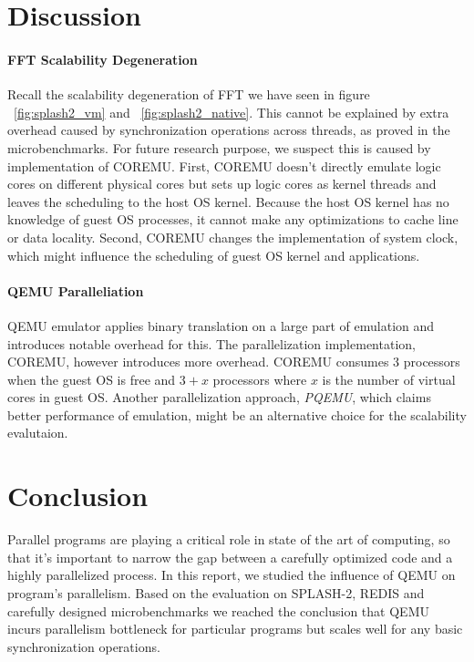 \section{Discussion}

\paragraph{FFT Scalability Degeneration} Recall the scalability degeneration of FFT
we have seen in figure ~\ref{fig:splash2_vm} and ~\ref{fig:splash2_native}. This 
cannot be explained by extra overhead caused by synchronization operations across
threads, as proved in the microbenchmarks. For future research purpose, we suspect
this is caused by implementation of COREMU. First, COREMU doesn't directly emulate
logic cores on different physical cores but sets up logic cores as kernel threads 
and leaves the scheduling to the host OS kernel. Because the host OS kernel has 
no knowledge of guest OS processes, it cannot make any optimizations to cache line
or data locality. Second, COREMU changes the implementation of system clock, which
might influence the scheduling of guest OS kernel and applications.

\paragraph{QEMU Paralleliation} QEMU emulator applies binary translation on a large
part of emulation and introduces notable overhead for this. The parallelization
implementation, COREMU, however introduces more overhead. COREMU consumes 3 
processors when the guest OS is free and $3 + x$ processors where $x$ is the 
number of virtual cores in guest OS. Another parallelization approach, 
\emph{PQEMU}, which claims better performance of emulation, might be an alternative
choice for the scalability evalutaion. 

\section{Conclusion}
Parallel programs are playing a critical role in state of the art of computing,
so that it's important to narrow the gap between a carefully optimized code and 
a highly parallelized process. In this report, we studied the influence of 
QEMU on program's parallelism. Based on the evaluation on SPLASH-2, REDIS and 
carefully designed microbenchmarks we reached the conclusion that QEMU incurs
parallelism bottleneck for particular programs but scales well for any basic
synchronization operations.

